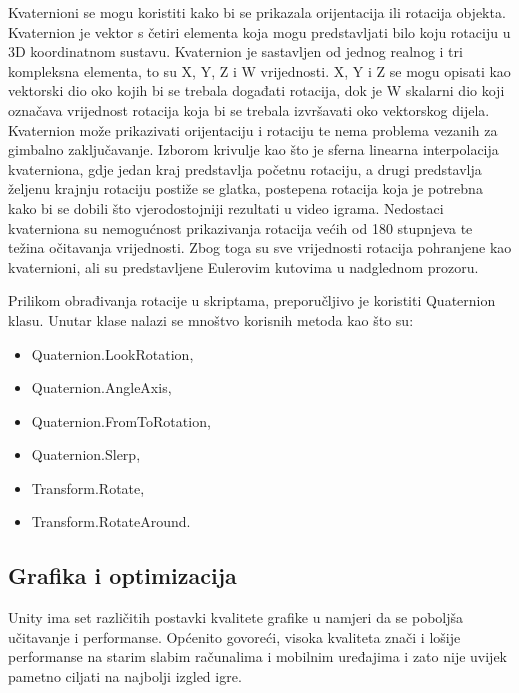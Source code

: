 Kvaternioni se mogu koristiti kako bi se prikazala orijentacija ili rotacija objekta. Kvaternion je vektor s četiri elementa koja mogu predstavljati bilo koju rotaciju u 3D koordinatnom sustavu. Kvaternion je sastavljen od jednog realnog i tri kompleksna elementa, to su X, Y, Z i W vrijednosti. X, Y i Z se mogu opisati kao vektorski dio oko kojih bi se trebala događati rotacija, dok je W skalarni dio koji označava vrijednost rotacija koja bi se trebala izvršavati oko vektorskog dijela. Kvaternion može prikazivati orijentaciju i rotaciju te nema problema vezanih za gimbalno zaključavanje. Izborom krivulje kao što je sferna linearna interpolacija kvaterniona, gdje jedan kraj predstavlja početnu rotaciju, a drugi predstavlja željenu krajnju rotaciju postiže se glatka, postepena rotacija koja je potrebna kako bi se dobili što vjerodostojniji rezultati u video igrama.
Nedostaci kvaterniona su nemogućnost prikazivanja rotacija većih od 180 stupnjeva te težina očitavanja vrijednosti. Zbog toga su sve vrijednosti rotacija pohranjene kao kvaternioni, ali su predstavljene Eulerovim kutovima u nadglednom prozoru.

Prilikom obrađivanja rotacije u skriptama, preporučljivo je koristiti Quaternion klasu. Unutar klase nalazi se mnoštvo korisnih metoda kao što su:
\begin{itemize}
  \item Quaternion.LookRotation,
  \item Quaternion.AngleAxis,
  \item Quaternion.FromToRotation,
  \item Quaternion.Slerp,
  \item Transform.Rotate,
  \item Transform.RotateAround.
\end{itemize}

\subsection{Grafika i optimizacija}
Unity ima set različitih postavki kvalitete grafike u namjeri da se poboljša učitavanje i performanse. Općenito govoreći, visoka kvaliteta znači i lošije performanse na starim slabim računalima i mobilnim uređajima i zato nije uvijek pametno ciljati na najbolji izgled igre. 

